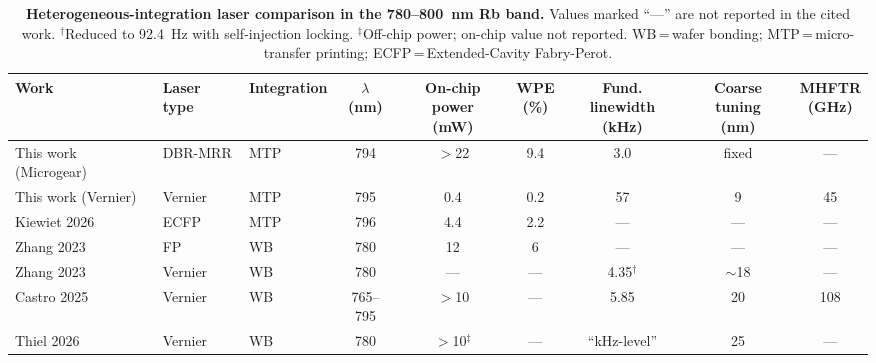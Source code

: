 \documentclass[%
 reprint,
 amsmath,amssymb,
 aps,
]{revtex4-2}
\begin{document}
\begin{table}[t]
\centering
\caption{\textbf{Heterogeneous-integration laser comparison in the 780--800~nm Rb band.} Values marked ``—'' are not reported in the cited work.  $^\dagger$Reduced to 92.4~Hz with self-injection locking. $^\ddagger$Off-chip power; on-chip value not reported. WB\,=\,wafer bonding; MTP\,=\,micro-transfer printing; ECFP\,=\,Extended-Cavity Fabry-Perot.}
\label{tab:comparison}
\begin{tabular}{lllcccccc}
\toprule
Work & Laser type & Integration & \makecell{$\lambda$\\(nm)} & \makecell{On-chip power\\(mW)} & \makecell{WPE\\(\%)} & \makecell{Fund. linewidth\\(kHz)} & \makecell{Coarse tuning\\(nm)} & \makecell{MHFTR\\(GHz)} \\
\midrule
This work (Microgear) & DBR-MRR & MTP & 794 & $>$22 & 9.4 & 3.0 & fixed & — \\
This work (Vernier)   & Vernier & MTP & 795 & 0.4 & 0.2  & 57 & 9 & 45 \\
Kiewiet 2026 \cite{kiewiet2026micro} & ECFP & MTP & 796 & 4.4 & 2.2 & — & — & — \\
\midrule
Zhang 2023 \cite{zhang2023photonic} & FP & WB & 780 & 12 & 6 & — & — & — \\
Zhang 2023 \cite{zhang2023photonic} & Vernier & WB & 780 & — & — & 4.35$^\dagger$ & $\sim$18 & — \\
Castro 2025 \cite{castro2025integrated} & Vernier & WB & 765--795 & $>$10 & — & 5.85 & 20 & 108 \\
Thiel 2026 \cite{thiel2026wafer} & Vernier & WB & 780 & $>$10$^\ddagger$ & — & ``kHz-level'' & 25 & — \\
\bottomrule
\end{tabular}
\end{table}
\end{document}
